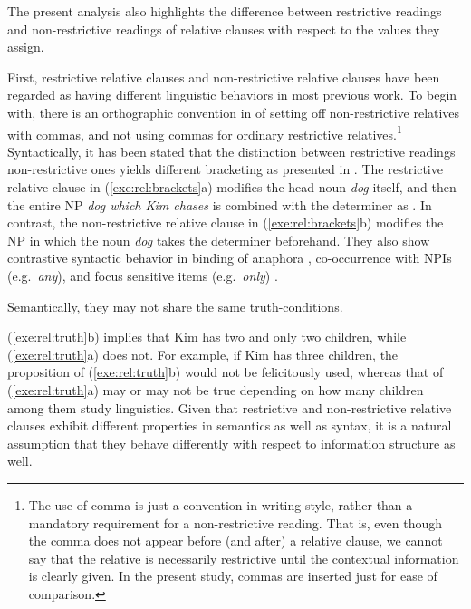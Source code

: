 The present analysis also highlights the difference between
restrictive readings and non-restrictive readings of relative clauses
with respect to the  values they assign.


First, restrictive relative clauses and non-restrictive relative
clauses have been regarded as having different linguistic behaviors in
most previous work.  To begin with, there is an orthographic
convention in  of setting off non-restrictive relatives with
commas, and not using commas for ordinary restrictive
relatives.\footnote{The use of comma is just
a convention in writing style, rather than a mandatory requirement for
a non-restrictive reading. That is, even though the comma does not
appear before (and after) a relative clause, we cannot say that the
relative is necessarily restrictive until the contextual information
is clearly given. In the present study, commas are inserted just for ease of
  comparison.} Syntactically, it has been stated that the distinction
between restrictive readings \vs non-restrictive ones yields different
bracketing as presented in . The restrictive relative clause in (\ref{exe:rel:brackets}a)
modifies the head noun \textit{dog} itself, and then the entire NP
\textit{dog which Kim chases} is combined with the determiner as
.  In contrast, the non-restrictive relative
clause in (\ref{exe:rel:brackets}b) modifies the NP in which the noun
\textit{dog} takes the determiner beforehand.  They also show
contrastive syntactic behavior in binding of anaphora
\citep{emonds:79}, co-occurrence with NPIs (e.g.\ \textit{any}), and
focus sensitive items (e.g.\ \textit{only}) \citep{fabb:90}.






\noindent Semantically, they may not share the same truth-conditions.




\noindent (\ref{exe:rel:truth}b) implies that Kim has two and only two
children, while (\ref{exe:rel:truth}a) does not. For example, if Kim
has three children, the proposition of (\ref{exe:rel:truth}b) would
not be felicitously used, whereas that of (\ref{exe:rel:truth}a) may
or may not be true depending on how many children among them study
linguistics.  Given that restrictive and non-restrictive relative
clauses exhibit different properties in semantics as well as syntax,
it is a natural assumption that they behave differently with respect
to information structure as well.



